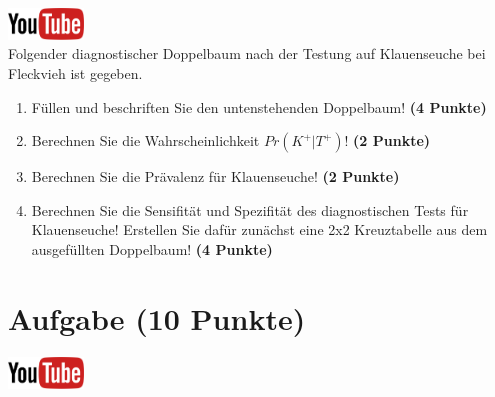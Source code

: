 \documentclass[a4paper, 9pt]{scrartcl}\usepackage[]{graphicx}\usepackage[]{xcolor}
\begin{document}
\hfill\href{https://youtu.be/_7s44pbOc00}{\includegraphics[width =
  2cm]{img/youtube}}\\[1Ex]





Folgender diagnostischer Doppelbaum nach der Testung auf Klauenseuche bei
Fleckvieh ist gegeben.

\begin{enumerate}
\item F{\"u}llen und beschriften Sie den untenstehenden Doppelbaum! \textbf{(4
    Punkte)}
\item Berechnen Sie die Wahrscheinlichkeit $Pr(K^+|T^+)$! \textbf{(2 Punkte)}
\item Berechnen Sie die Pr{\"a}valenz f{\"u}r Klauenseuche! \textbf{(2 Punkte)}
\item Berechnen Sie die Sensifit{\"a}t und Spezifit{\"a}t des diagnostischen Tests
  f{\"u}r Klauenseuche! Erstellen Sie daf{\"u}r zun{\"a}chst eine 2x2 Kreuztabelle aus
  dem ausgef{\"u}llten Doppelbaum!
  \textbf{(4 Punkte)}
\end{enumerate}

\vspace{1cm}
 




 
\clearpage

\section{Aufgabe \hfill (10 Punkte)}

\hfill\href{https://youtu.be/G-_r2KplGTI}{\includegraphics[width =
  2cm]{img/youtube}}\\[1Ex]
\end{document}
